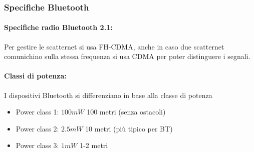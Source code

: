 \subsubsection{Specifiche Bluetooth}
\paragraph{Specifiche radio Bluetooth 2.1:}
\begin{center}
	{
	}
\end{center}
Per gestire le scatternet si usa FH-CDMA, anche in caso due scatternet comunichino sulla stessa frequenza si usa CDMA per poter distinguere i segnali.\\

\paragraph{Classi di potenza:} I dispositivi Bluetooth si differenziano in base alla classe di potenza
\begin{itemize}
	\item Power class 1: $100 mW$ 100 metri (senza ostacoli)
	\item Power class 2: $2.5 mW$ 10 metri (più tipico per BT)
	\item Power class 3: $1 mW$ 1-2 metri
\end{itemize}

